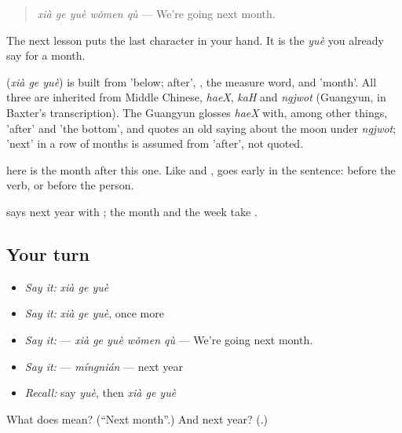 \begin{quote}
\textbf{} \emph{xià ge yuè wǒmen qù} — We're going next month.
\end{quote}

The next lesson puts the last character in your hand. It is the \emph{yuè} you already say for a month.

\begin{cousinweb}
\textbf{} (\emph{xià ge yuè}) is built from  'below; after', , the measure word, and  'month'. All three are inherited from Middle Chinese, \emph{haeX}, \emph{kaH} and \emph{ngjwot} (Guangyun, in Baxter's transcription). The Guangyun glosses \emph{haeX} with, among other things, 'after' and 'the bottom', and quotes an old saying about the moon under \emph{ngjwot}; 'next' in a row of months is assumed from 'after', not quoted.
\end{cousinweb}

\begin{grammarlens}[title={What you've built}]
 here is the month after this one. Like  and ,  goes early in the sentence: before the verb, or before the person.

 says next year with ; the month and the week take .
\end{grammarlens}

\subsection*{Your turn}
\begin{itemize}
\raggedright
  \item \emph{Say it:} \emph{xià ge yuè}
  \item \emph{Say it:} \emph{xià ge yuè}, once more
  \item \emph{Say it:}  — \emph{xià ge yuè wǒmen qù} — We're going next month.
  \item \emph{Say it:}  — \emph{míngnián} — next year
  \item \emph{Recall:} say \emph{yuè}, then \emph{xià ge yuè}
\end{itemize}

\begin{tcolorbox}[breakable,colback=teal!4,colframe=teal!35!black,title={Before you move on}]
What does  mean? (\textquotedblleft{}Next month\textquotedblright{}.) And next year? (\textbf{}.)
\end{tcolorbox}
